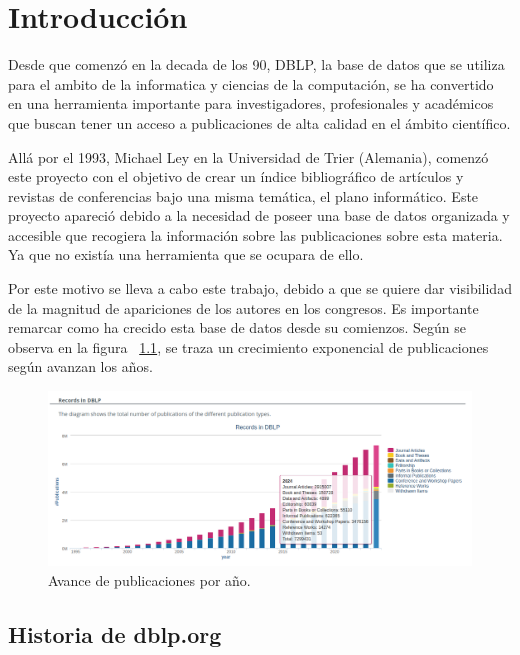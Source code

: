 \documentclass[a4paper, 12pt]{book}
\begin{document}
\cleardoublepage
\chapter{Introducción}
\label{sec:intro} %

Desde que comenzó en la decada de los 90, DBLP, la base de datos que se utiliza para el ambito de la informatica y ciencias de la computación, se ha convertido en una herramienta importante para investigadores, profesionales y académicos que buscan tener un acceso a publicaciones de alta calidad en el ámbito científico.

Allá por el 1993, Michael Ley en la Universidad de Trier (Alemania), comenzó este proyecto con el objetivo de crear un índice bibliográfico de artículos y revistas de conferencias bajo una misma temática, el plano informático. Este proyecto apareció debido a la necesidad de poseer una base de datos organizada y accesible que recogiera la información sobre las publicaciones sobre esta materia. Ya que no existía una herramienta que se ocupara de ello.

Por este motivo se lleva a cabo este trabajo, debido a que se quiere dar visibilidad de la magnitud de apariciones de los autores en los congresos. Es importante remarcar como ha crecido esta base de datos desde su comienzos. Según se observa en la figura ~\ref{figura:progresion_base_dblp}, se traza un crecimiento exponencial de publicaciones según avanzan los años.

\begin{figure}[h]
    \centering
    \includegraphics[width=16cm, keepaspectratio]{img/dblp_total_publications_per_year.png}
    \caption{Avance de publicaciones por año.}
    \label{figura:progresion_base_dblp}
 \end{figure}


\section{Historia de dblp.org}
\label{sec:seccion}
\end{document}
